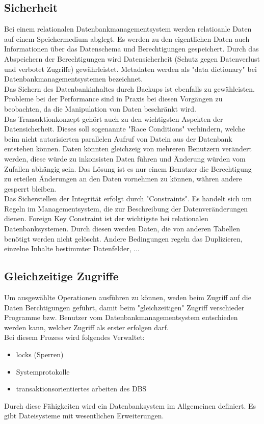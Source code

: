 \documentclass[12pt,a4paper]{report}
\begin{document}
\begin{onehalfspace}
\subsection{Sicherheit}
Bei einem relationalen Datenbankmanagementsystem werden relatioanle Daten auf einem Speichermedium abglegt. Es werden zu den eigentlichen Daten auch Informationen über das Datenschema und Berechtigungen gespeichert. Durch das Abspeichern der Berechtigungen wird Datensicherheit (Schutz gegen Datenverlust und verbotet Zugriffe) gewährleistet. Metadaten werden als "{}data dictionary"{} bei Datenbankmanagementsystemen bezeichnet.\\

Das Sichern des Datenbankinhaltes durch Backups ist ebenfalls zu gewähleisten. Probleme bei der Performance sind in Praxis bei diesen Vorgängen zu beobachten, da die Manipulation von Daten beschränkt wird. \\

Das Transaktionkonzept gehört auch zu den wichtigsten Aspekten der Datensicherheit. Dieses soll sogenannte "{}Race Conditions"{} verhindern, welche beim nicht autorisierten parallelen Aufruf von Datein aus der Datenbank entstehen können. Daten könnten gleichzeig von mehreren Benutzern verändert werden, diese würde zu inkonsisten Daten führen und Änderung würden vom Zufallen abhängig sein. Das Lösung ist es nur einem Benutzer die Berechtigung zu erteilen Änderungen an den Daten vornehmen zu können, währen andere gesperrt bleiben.\\

Das Sicherstellen der Integrität erfolgt durch "{}Constraints"{}. Es handelt sich um Regeln im Managementsystem, die zur Beschreibung der Datenveränderungen dienen. Foreign Key Constraint ist der wichtigste bei relationalen Datenbanksystemen. Durch diesen werden Daten, die von anderen Tabellen benötigt werden nicht gelöscht. Andere Bedingungen regeln das Duplizieren, einzelne Inhalte bestimmter Datenfelder, ...

\subsection{Gleichzeitige Zugriffe}
Um ausgewählte Operationen ausführen zu können, weden beim Zugriff auf die Daten Berchtigungen geführt, damit beim "{}gleichzeitigen"{} Zugriff verschieder Programme bzw. Benutzer vom Datenbankmanagementsystem entschieden werden kann, welcher Zugriff als erster erfolgen darf.\\
Bei diesem Prozess wird folgendes Verwaltet:
\begin{itemize}
\item locks (Sperren)
\item Systemprotokolle
\item transaktionsorientiertes arbeiten des DBS
\end{itemize}
Durch diese Fähigkeiten wird ein Datenbanksystem im Allgemeinen definiert. Es gibt Dateisysteme mit wesentlichen Erweiterungen.\\


\end{onehalfspace}
\end{document}
